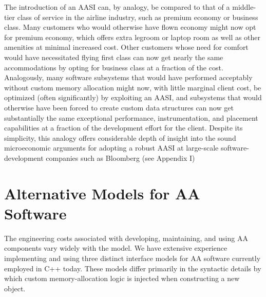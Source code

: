 The introduction of an AASI can, by analogy, be compared to that of a middle-tier
class of service in the airline industry, such as premium economy or business class.
Many customers who would otherwise have flown economy might now opt for
premium economy, which offers extra legroom or laptop room as well as other
amenities at minimal increased cost. Other customers whose need for comfort would
have necessitated flying first class can now get nearly the same accommodations by
opting for business class at a fraction of the cost. Analogously, many software
subsystems that would have performed acceptably without custom memory
allocation might now, with little marginal client cost, be optimized (often
significantly) by exploiting an AASI, and subsystems that would otherwise have been
forced to create custom data structures can now get substantially the same
exceptional performance, instrumentation, and placement capabilities at a fraction 
of the development effort for the client. Despite its simplicity, this analogy offers
considerable depth of insight into the sound microeconomic arguments for adopting
a robust AASI at large-scale software-development companies such as Bloomberg
(see Appendix I)

\section{Alternative Models for AA Software}
The engineering costs associated with developing, maintaining, and using AA
components vary widely with the model. We have extensive experience implementing
and using three distinct interface models for AA software currently employed in C++
today. These models differ primarily in the syntactic details by which custom
memory-allocation logic is injected when constructing a new object.

